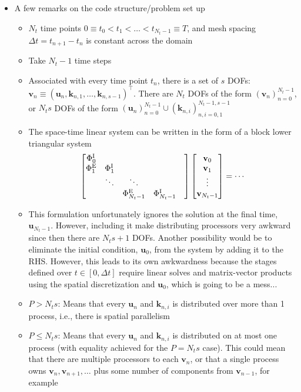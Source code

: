 \documentclass[a4paper,10pt]{article}
\begin{document}
\begin{itemize}
\item A few remarks on the code structure/problem set up
\begin{itemize}
\item $N_t$ time points $0 \equiv t_0 < t_1 < \ldots < t_{N_t-1} \equiv T$, and mesh spacing $\Delta t = t_{n+1} - t_{n}$ is constant across the domain
\item Take $N_t-1$ time steps
\item Associated with every time point $t_n$, there is a set of $s$ DOFs: $\mathbf{v}_{n} \equiv (\mathbf{u}_n,\mathbf{k}_{n,1}, \ldots, \mathbf{k}_{n,s-1})^\top$. There are $N_t$ DOFs of the form $(\mathbf{v}_n)_{n = 0}^{N_t-1}$, or $N_t s$ DOFs of the form $(\mathbf{u}_n)_{n = 0}^{N_t-1} \cup (\mathbf{k}_{n,i})_{n,i=0,1}^{N_t-1,s-1}$
\item The space-time linear system can be written in the form of a block lower triangular system
\begin{align}
\begin{bmatrix}
\Phi^{\rm I}_0 & \\
\Phi^{\rm E}_1 & \Phi^{\rm I}_1 &  \\
					& \ddots & \ddots \\
					& 				& \Phi^{\rm E}_{N_t-1} & \Phi^{\rm I}_{N_t-1} &  \\
\end{bmatrix}
\begin{bmatrix}
\mathbf{v}_{0} \\
\mathbf{v}_{1} \\ 
\vdots \\
\mathbf{v}_{N_t-1} \\
\end{bmatrix}
= \cdots
\end{align}
\item This formulation unfortunately ignores the solution at the final time, $\mathbf{u}_{N_t-1}$. However, including it make distributing processors very awkward since then there are $N_t s + 1$ DOFs. Another possibility would be to eliminate the initial condition, $\mathbf{u}_0$, from the system by adding it to the RHS. However, this leads to its own awkwardness because the stages defined over $t \in [0,\Delta t]$ require linear solves and matrix-vector products using the spatial discretization and $\mathbf{u}_0$, which is going to be a mess...
\item $P > N_t s$: Means that every $\mathbf{u}_n$ and $\mathbf{k}_{n,i}$ is distributed over more than 1 process, i.e., there is spatial parallelism
\item $P \leq N_t s$: Means that every $\mathbf{u}_n$ and $\mathbf{k}_{n,i}$ is distributed on at most one process (with equality achieved for the $P = N_t s$ case). This could mean that there are multiple processors to each $\mathbf{v}_n$, or that a single process owns $\mathbf{v}_n, \mathbf{v}_{n+1}, \ldots$ plus some number of components from $\mathbf{v}_{n-1}$, for example
\end{itemize}
\end{itemize}
\end{document}
